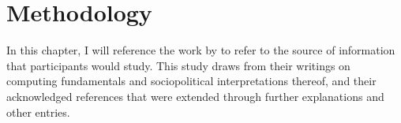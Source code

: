 \chapter{Methodology}
In this chapter, I will reference the work by \cite{soon:2020} to refer to the source of information that participants would study. This study draws from their writings on computing fundamentals and sociopolitical interpretations thereof, and their acknowledged references that were extended through further explanations and other entries.








